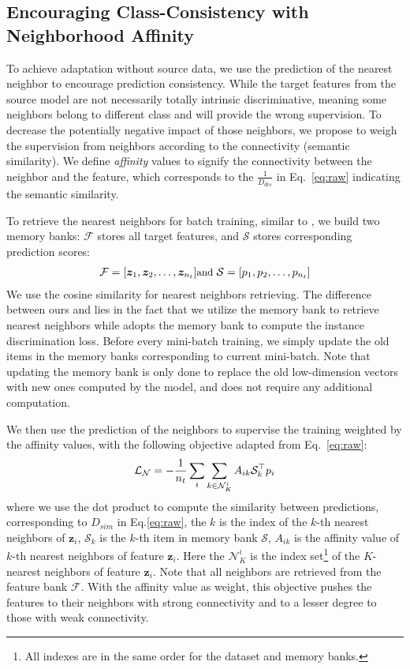 \documentclass{article}
\begin{document}
\subsection{Encouraging Class-Consistency with Neighborhood Affinity} To achieve adaptation without source data, we use the prediction of the nearest neighbor to encourage prediction consistency. 
{While the target features from the source model are not necessarily totally intrinsic discriminative, meaning some neighbors belong to different class and will provide the wrong supervision. To decrease the potentially negative impact of those neighbors, we propose to weigh the supervision from neighbors according to the connectivity (semantic similarity)}.
We define \textit{affinity} values to signify the connectivity between the neighbor and the feature, which corresponds to the $\frac{1}{D_{dis}}$ in Eq.~\ref{eq:raw} indicating the semantic similarity. 

To retrieve the nearest neighbors for batch training, similar to \cite{saito2020universal,wu2018unsupervised,zhuang2019local}, we build two memory banks: $\mathcal{F}$ stores all target features, and $\mathcal{S}$ stores corresponding prediction scores: \begin{eqnarray}\label{def:banks}
\small
\mathcal{F}=[\bm{z}_1,\bm{z}_2,\dots,\bm{z}_{n_t}] \text{and }
    \mathcal{S}=[p_1,p_2,\dots,p_{n_t}]
\end{eqnarray}
We use the cosine similarity for nearest neighbors retrieving. The difference between ours and \cite{saito2020universal,wu2018unsupervised} lies in the fact that we utilize the memory bank to retrieve nearest neighbors while \cite{saito2020universal,wu2018unsupervised} adopts the memory bank to compute the instance discrimination loss. Before every mini-batch training, we simply update the old items in the memory banks corresponding to current mini-batch. Note that updating the memory bank is only done to replace the old low-dimension vectors with new ones computed by the model, and does not require any additional computation.

We then use the prediction of the neighbors to supervise the training weighted by the affinity values, with the following objective adapted from Eq.~\ref{eq:raw}:
\begin{eqnarray}\label{eq:nn}
\small
    \mathcal{L}_{\mathcal{N}}=-\frac{1}{n_t}\sum_{i}\sum_{k\in \mathcal{N}_K^i} A_{ik} \mathcal{S}_k^\top p_i
\end{eqnarray}
where we use the dot product to compute the similarity between predictions, corresponding to $D_{sim}$ in Eq.\ref{eq:raw}, the $k$ is the index of the $k$-th nearest neighbors of $\bm{z}_i$, $\mathcal{S}_k$ is the $k$-th item in memory bank $\mathcal{S}$, $A_{ik}$ is the affinity value of $k$-th nearest neighbors of feature $\bm{z}_i$. Here the $\mathcal{N}_K^i$ is the index set\footnote{All indexes are in the same order for the dataset and memory banks.} of the $K$-nearest neighbors of feature $\bm{z}_i$. Note that all neighbors are retrieved from the feature bank $\mathcal{F}$. With the affinity value as weight, this objective pushes the features to their neighbors with strong connectivity and to a lesser degree to those with weak connectivity. 
\end{document}
